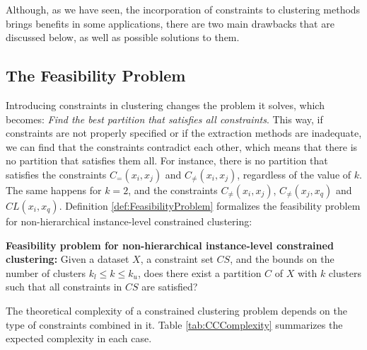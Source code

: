 Although, as we have seen, the incorporation of constraints to clustering methods brings benefits in some applications, there are two main drawbacks that are discussed below, as well as possible solutions to them.

\subsection{The Feasibility Problem}

Introducing constraints in clustering changes the problem it solves, which becomes: \textit{Find the best partition that satisfies all constraints}. This way, if constraints are not properly specified or if the extraction methods are inadequate, we can find that the constraints contradict each other, which means that there is no partition that satisfies them all. For instance, there is no partition that satisfies the constraints $C_=(x_i,x_j)$ and $C_{\neq}(x_i,x_j)$, regardless of the value of $k$. The same happens for $k = 2$, and the constraints $C_{\neq}(x_i, x_j)$, $C_{\neq}(x_j, x_q)$ and $CL(x_i, x_q)$. Definition \ref{def:FeasibilityProblem} formalizes the feasibility problem for non-hierarchical instance-level constrained clustering:

\begin{definition}
	
	\textbf{Feasibility problem for non-hierarchical instance-level constrained clustering:} Given a dataset $X$, a constraint set $CS$, and the bounds on the number of clusters $k_l \leq k \leq k_u$, does there exist a partition $C$ of $X$ with $k$ clusters such that all constraints in $CS$ are satisfied? \cite{davidson2005clustering} \cite{davidson2007survey}
	
	\label{def:FeasibilityProblem}
	
\end{definition}

 The theoretical complexity of a constrained clustering problem depends on the type of constraints combined in it. Table \ref{tab:CCComplexity} summarizes the expected complexity in each case. 

